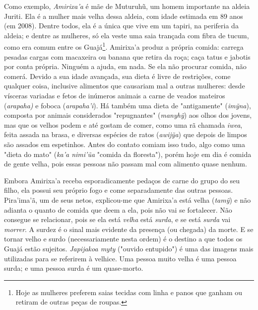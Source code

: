 Como exemplo, \emph{Amirixa'a} é mãe de Muturuhũ, um homem importante na
aldeia Juriti. Ela é a mulher mais velha dessa aldeia, com idade
estimada em 89 anos (em 2008). Dentre todos, ela é a única que vive em
um tapiri, na periferia da aldeia; e dentre as mulheres, só ela veste
uma saia trançada com fibra de tucum, como era comum entre os
Guajá\footnote{Hoje as mulheres preferem saias tecidas com linha e panos
  que ganham ou retiram de outras peças de roupas.}. Amirixa'a produz a
própria comida: carrega pesadas cargas com macaxeira ou banana que
retira da roça; caça tatus e jabotis por conta própria. Ninguém a ajuda,
em nada. Se ela não procurar comida, não comerá. Devido a sua idade
avançada, sua dieta é livre de restrições, come qualquer coisa,
inclusive alimentos que causariam mal a outras mulheres: desde vísceras
variadas e fetos de inúmeros animais a carne de veados mateiros
(\emph{arapaha)} e foboca (\emph{arapaha'i}). Há também uma dieta de
"antigamente" (\emph{imỹna}), composta por animais considerados
"repugnantes" (\emph{manyhỹ}) aos olhos dos jovens, mas que os velhos
podem e até gostam de comer, como uma rã chamada \emph{iwea}, feita
assada na brasa, e diversas espécies de ratos (\emph{awijỹa}) que depois
de limpos são assados em espetinhos. Antes do contato comiam isso tudo,
algo como uma "dieta do mato" (\emph{ka'a nimi'ũa} "comida da
floresta"), porém hoje em dia é comida de gente velha, pois essas
pessoas não passam mal com alimento quase nenhum.

Embora Amirixa'a receba esporadicamente pedaços de carne do grupo do seu
filho, ela possui seu próprio fogo e come separadamente das outras
pessoas. Pira'ima'ã, um de seus netos, explicou-me que Amirixa'a está
velha (\emph{tamỹ}) e não adianta o quanto de comida que deem a ela,
pois não vai se fortalecer. Não consegue se relacionar, pois se ela está
\emph{velha} está \emph{surda}, e se está \emph{surda} vai
\emph{morrer}. A surdez é o sinal mais evidente da presença (ou chegada)
da morte. E se tornar velho e surdo (necessariamente nesta ordem) é o
destino a que todos os Guajá estão sujeitos. \emph{Japijakoa myty}
("ouvido entupido") é uma das imagens mais utilizadas para se referirem
à velhice. Uma pessoa muito velha é uma pessoa surda; e uma pessoa surda
é um quase-morto.

